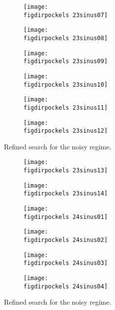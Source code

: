 \begin{figure}
    \begin{subfigure}[b]{\picwidth}
        \texttt{[image: \\figdirpockels 23sinus07]}
        \caption{}
    \end{subfigure}\qquad
    \begin{subfigure}[b]{\picwidth}
        \texttt{[image: \\figdirpockels 23sinus08]}
        \caption{}
    \end{subfigure}
    \begin{subfigure}[b]{\picwidth}
        \texttt{[image: \\figdirpockels 23sinus09]}
        \caption{}
    \end{subfigure}
    \begin{subfigure}[b]{\picwidth}
        \texttt{[image: \\figdirpockels 23sinus10]}
        \caption{}
    \end{subfigure}
    \begin{subfigure}[b]{\picwidth}
        \texttt{[image: \\figdirpockels 23sinus11]}
        \caption{}
    \end{subfigure}
    \begin{subfigure}[b]{\picwidth}
        \texttt{[image: \\figdirpockels 23sinus12]}
        \caption{}
    \end{subfigure}
    \caption{Refined search for the noisy regime.}
    \label{fig:sinus6}
\end{figure}
\begin{figure}
    \begin{subfigure}[b]{\picwidth}
        \texttt{[image: \\figdirpockels 23sinus13]}
        \caption{}
    \end{subfigure}\qquad
    \begin{subfigure}[b]{\picwidth}
        \texttt{[image: \\figdirpockels 23sinus14]}
        \caption{}
    \end{subfigure}
    \begin{subfigure}[b]{\picwidth}
        \texttt{[image: \\figdirpockels 24sinus01]}
        \caption{}
    \end{subfigure}
    \begin{subfigure}[b]{\picwidth}
        \texttt{[image: \\figdirpockels 24sinus02]}
        \caption{}
    \end{subfigure}
    \begin{subfigure}[b]{\picwidth}
        \texttt{[image: \\figdirpockels 24sinus03]}
        \caption{}
    \end{subfigure}
    \begin{subfigure}[b]{\picwidth}
        \texttt{[image: \\figdirpockels 24sinus04]}
        \caption{}
    \end{subfigure}
    \caption{Refined search for the noisy regime.}
    \label{fig:sinus7}
\end{figure}

